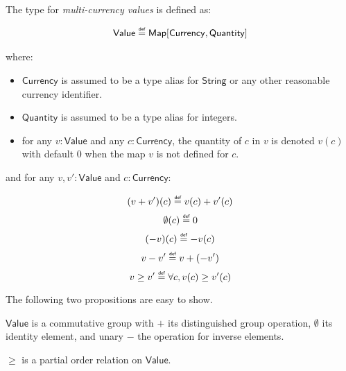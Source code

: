 \documentclass{llncs}
\newcommand{\defeq}{\mathrel{\overset{\makebox[0pt]{\mbox{\normalfont\tiny\sffamily def}}}{=}}}
\newcommand{\type}[1]{\mathsf{#1}}
\newcommand{\mapT}{\type{Map}}
\newcommand{\stringT}{\type{String}}
\newcommand{\valueT}{\type{Value}}
\newcommand{\currencyT}{\type{Currency}}
\newcommand{\quantityT}{\type{Quantity}}
\newenvironment{smallish}{
	\begin{small}
}{
	\end{small}
}
\begin{document}
\begin{definition}
\label{def:MultiCurrencyValue}
The type for \emph{multi-currency values} is defined as:
\begin{smallish}
\begin{equation*}
\begin{split}
\valueT \defeq \mapT[\currencyT, \quantityT]
\end{split}
\end{equation*}
\end{smallish}
where:
\begin{itemize}
\item $\currencyT$ is assumed to be a type alias for $\stringT$ or any other reasonable currency identifier.
\item $\quantityT$ is assumed to be a type alias for integers.
\item for any $v: \valueT$ and any $c: \currencyT$, the quantity of $c$ in $v$ is denoted $v(c)$ with default $0$ when the map $v$ is not defined for $c$.
\end{itemize}
and for any $v, v': \valueT$ and $c: \currencyT$:
\begin{smallish}
\begin{equation*}
(v + v')(c) \defeq v(c) + v'(c)
\end{equation*}
\begin{equation*}
\emptyset(c) \defeq 0
\end{equation*}
\begin{equation*}
(- v)(c) \defeq - v(c)
\end{equation*}
\begin{equation*}
v - v' \defeq v + (- v')
\end{equation*}
\begin{equation*}
v \ge v' \defeq \forall c, v(c) \ge v'(c)
\end{equation*}
\end{smallish}
\end{definition}

The following two propositions are easy to show.

\begin{proposition}
$\valueT$ is a commutative group with $+$ its distinguished group operation, $\emptyset$ its identity element, and unary $-$ the operation for inverse elements.
\end{proposition}

\begin{proposition}
$\ge$ is a partial order relation on $\valueT$.
\end{proposition}
\end{document}
